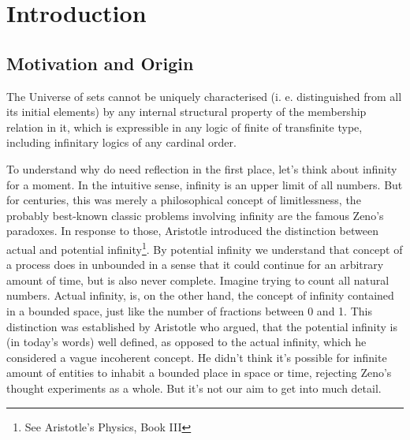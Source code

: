 \documentclass[12pt,a4paper]{article}
\begin{document}
\tableofcontents
\clearpage

\pagestyle{fancy} %
\renewcommand{\sectionmark}[1]{\markboth{\slshape\thesection.\ #1}{}}

\section{Introduction}\label{sec:introduction}

\subsection{Motivation and Origin}
\begin{displayquote}
The Universe of sets cannot be uniquely characterised (i. e. distinguished from all its initial elements) by any internal structural property of the membership relation in it, which is expressible in any logic of finite of transfinite type, including infinitary logics of any cardinal order.
\end{displayquote}

To understand why do need reflection in the first place, let's think about infinity for a moment. In the intuitive sense, infinity is an upper limit of all numbers. But for centuries, this was merely a philosophical concept of limitlessness, the probably best-known classic problems involving infinity are the famous Zeno's paradoxes. In response to those, Aristotle introduced the distinction between actual and potential infinity\footnote{See Aristotle’s Physics, Book III}. By potential infinity we understand that concept of a process does in unbounded in a sense that it could continue for an arbitrary amount of time, but is also never complete. Imagine trying to count all natural numbers. Actual infinity, is, on the other hand, the concept of infinity contained in a bounded space, just like the number of fractions between 0 and 1. This distinction was established by Aristotle who argued, that the potential infinity is (in today's words) well defined, as opposed to the actual infinity, which he considered a vague incoherent concept. He didn't think it's possible for infinite amount of entities to inhabit a bounded place in space or time, rejecting Zeno's thought experiments as a whole. But it's not our aim to get into much detail. 
\end{document}
